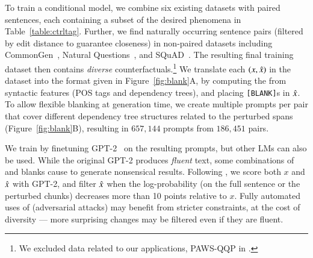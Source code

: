 

To train a conditional model, we combine six existing datasets with paired sentences, each containing a subset of the desired phenomena in Table~\ref{table:ctrltag}. 
Further, we find naturally occurring sentence pairs (filtered by edit distance to guarantee closeness) in non-paired datasets including CommonGen~\cite{lin-etal-2020-commongen}, Natural Questions~\cite{kwiatkowski-etal-2019-natural}, and SQuAD~\cite{rajpurkar-etal-2016-squad}. 
The resulting final training dataset then contains \emph{diverse} counterfactuals.\footnote{We excluded data related to our applications, \eg PAWS-QQP in \cite{zhang2019paws}. }
We translate each $(x, \hat{x})$ in the dataset into the format given in Figure~\ref{fig:blank}A, by computing the \tagstr from syntactic features (POS tags and dependency trees), and placing \texttt{[BLANK]}s in $\hat{x}$. 
To allow flexible blanking at generation time, we create multiple prompts per pair that cover  different dependency tree structures related to the perturbed spans (Figure~\ref{fig:blank}B), resulting in $657,144$ prompts from $186,451$ pairs.

We train \sysname by finetuning GPT-2~\cite{radford2019language} on the resulting prompts, but other LMs can also be used.
While the original GPT-2 produces \emph{fluent} text, some combinations of \tagstrs and blanks cause \sysname to generate nonsensical results.
Following \citet{morris2020textattack}, we score both $x$ and $\hat{x}$ with GPT-2, and filter $\hat{x}$ when the log-probability (on the full sentence or the perturbed chunks) decreases more than 10 points relative to $x$.
Fully automated uses of \sysname (\eg adversarial attacks) may benefit from stricter constraints, at the cost of diversity --- more surprising changes may be filtered even if they are fluent.


